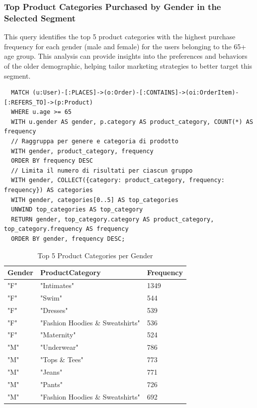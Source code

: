 \documentclass[a4paper,12pt]{article}
\begin{document}
\subsubsection{Top Product Categories Purchased by Gender in the Selected Segment}
This query identifies the top 5 product categories with the highest purchase frequency for each gender (male and female) for the users belonging to the 65+ age group.
This analysis can provide insights into the preferences and behaviors of the older demographic, helping tailor marketing strategies to better target this segment.

\begin{verbatim}
  MATCH (u:User)-[:PLACES]->(o:Order)-[:CONTAINS]->(oi:OrderItem)-[:REFERS_TO]->(p:Product)
  WHERE u.age >= 65
  WITH u.gender AS gender, p.category AS product_category, COUNT(*) AS frequency
  // Raggruppa per genere e categoria di prodotto
  WITH gender, product_category, frequency
  ORDER BY frequency DESC
  // Limita il numero di risultati per ciascun gruppo
  WITH gender, COLLECT({category: product_category, frequency: frequency}) AS categories
  WITH gender, categories[0..5] AS top_categories
  UNWIND top_categories AS top_category
  RETURN gender, top_category.category AS product_category, top_category.frequency AS frequency
  ORDER BY gender, frequency DESC;
\end{verbatim}

\begin{table}[h!]
  \centering
  \caption{Top 5 Product Categories per Gender}
  \label{tab:processing_data}
  \begin{tabular}{l l l}
      \toprule
      \textbf{Gender} & \textbf{ProductCategory} & \textbf{Frequency} \\
      \midrule
      "F"	& "Intimates" &	1349\\
      "F" & "Swim" & 544 \\
      "F" & "Dresses" & 539 \\
      "F" & "Fashion Hoodies \& Sweatshirts" & 536 \\
      "F" & "Maternity" & 524 \\
      "M" & "Underwear" & 786 \\
      "M" & "Tops \& Tees" & 773 \\
      "M" & "Jeans" & 771 \\
      "M" & "Pants" & 726 \\
      "M" & "Fashion Hoodies \& Sweatshirts" & 692 \\
      \bottomrule
  \end{tabular}
\end{table}
\end{document}
